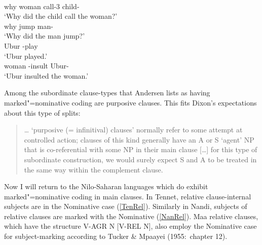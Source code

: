 \begin{exe}\ex\label{ParMN}
\begin{xlist}
\ex\gll {}   \\
why woman call-3\sg{} child-\erg{}\\
\glt`Why did the child call the woman?'
\ex\gll{}  \\
why jump man-\erg{}\\
\glt`Why did the man jump?'
\ex\gll{} \\
Ubur \compl{}-play\\
\glt `Ubur played.'
\ex\gll{}  \\
woman \compl{}-insult Ubur-\erg{}\\
\glt `Ubur insulted the woman.'
\end{xlist}
\end{exe} %

Among the subordinate clause-types that Andersen lists as having marked"=nominative coding are purposive clauses.  
This fits Dixon's expectations about this type of splits:

\begin{quote}
\ldots{} `purposive (= infinitival) clauses' normally refer to some attempt at controlled action; clauses of this kind generally have an A or S `agent' NP that is co-referential with some NP in their main clause [\dots] for this type of subordinate construction, we would surely expect S and A to be treated in the same way within the complement clause. 
\citep[101f.]{Dixon:1994}
\end{quote}

Now I will return to the Nilo-Saharan languages which do exhibit marked"=nominative coding in main clauses.
In Tennet, relative clause-internal subjects are in the Nominative  case (\ref{TenRel}).
Similarly in Nandi, subjects of relative clauses are marked with the Nominative  (\ref{NanRel}).
Maa relative clauses, which have the structure V-AGR N [V-REL N], also employ the Nominative  case for subject-marking according to Tucker \& Mpaayei (1955:~chapter 12).%

